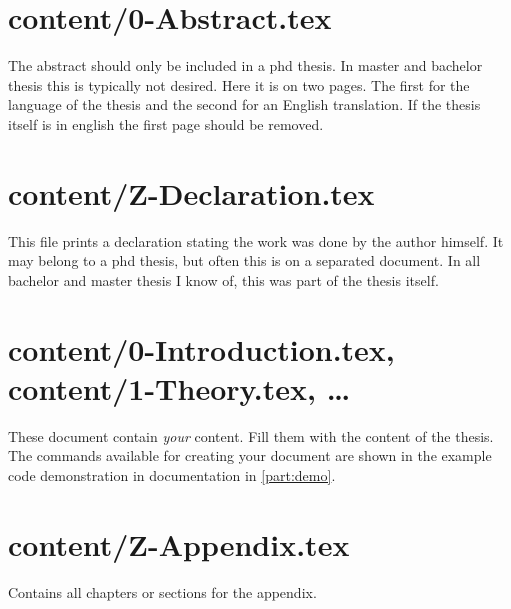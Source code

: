 
\section{content/0-Abstract.tex}

The abstract should only be included in a phd thesis. In master and bachelor thesis this is typically not desired. Here it is on two pages. The first for the language of the thesis and the second for an English translation.
If the thesis itself is in english the first page should be removed.


\section{content/Z-Declaration.tex}

This file prints a declaration stating the work was done by the author himself.
It may belong to a phd thesis, but often this is on a separated document. In all bachelor and master thesis I know of, this was part of the thesis itself.



\section{content/0-Introduction.tex, content/1-Theory.tex, \ldots}

These document contain \emph{your} content. Fill them with the content of the thesis. The commands available for creating your document are shown in the example code demonstration in documentation in \cref{part:demo}.

\section{content/Z-Appendix.tex}

Contains all chapters or sections for the appendix.

